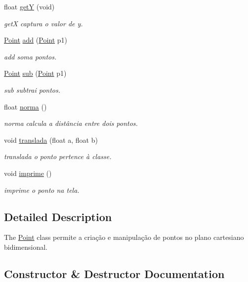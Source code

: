 \begin{DoxyCompactItemize}
float \mbox{\hyperlink{class_point_a2444daa96871c89614510bc4bfcd19ce}{getY}} (void)
\begin{DoxyCompactList}\small\item\em getX captura o valor de y. \end{DoxyCompactList}\item 
\mbox{\hyperlink{class_point}{Point}} \mbox{\hyperlink{class_point_a9dbea84b07b0a8ec3bbb9e58b3d15899}{add}} (\mbox{\hyperlink{class_point}{Point}} p1)
\begin{DoxyCompactList}\small\item\em add soma pontos. \end{DoxyCompactList}\item 
\mbox{\hyperlink{class_point}{Point}} \mbox{\hyperlink{class_point_a9cf2c53b0a4e6282a6712824bb4e9b00}{sub}} (\mbox{\hyperlink{class_point}{Point}} p1)
\begin{DoxyCompactList}\small\item\em sub subtrai pontos. \end{DoxyCompactList}\item 
float \mbox{\hyperlink{class_point_abd2618d1f505d9392893273a66e7c9b2}{norma}} ()
\begin{DoxyCompactList}\small\item\em norma calcula a distância entre dois pontos. \end{DoxyCompactList}\item 
void \mbox{\hyperlink{class_point_ad9676e36f3444534b609e3c68422239a}{translada}} (float a, float b)
\begin{DoxyCompactList}\small\item\em translada o ponto pertence à classe. \end{DoxyCompactList}\item 
void \mbox{\hyperlink{class_point_a1fb5c2501c27ab2cbc99d06c2a26a741}{imprime}} ()
\begin{DoxyCompactList}\small\item\em imprime o ponto na tela. \end{DoxyCompactList}\end{DoxyCompactItemize}


\subsection{Detailed Description}
The \mbox{\hyperlink{class_point}{Point}} class permite a criação e manipulação de pontos no plano cartesiano bidimensional. 

\subsection{Constructor \& Destructor Documentation}
\mbox{\label{class_point_a6524332fa4d321ff0a001366a732c7b6}} 
